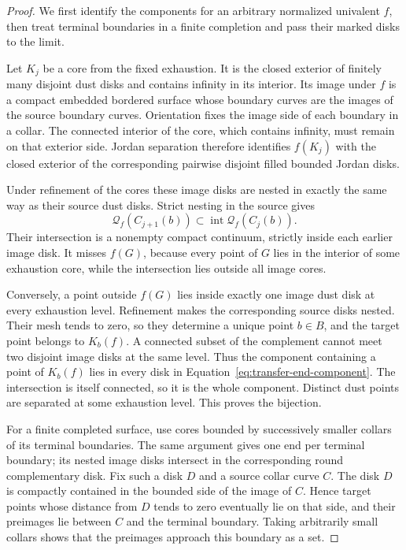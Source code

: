 \begin{proof}
We first identify the components for an arbitrary normalized univalent
$f$, then treat terminal boundaries in a finite completion and pass
their marked disks to the limit.

Let $K_j$ be a core from the fixed exhaustion.  It is the closed
exterior of finitely many disjoint dust disks and contains infinity
in its interior.  Its image under $f$ is a compact embedded bordered
surface whose boundary curves are the images of the source boundary
curves.  Orientation fixes the image side of each boundary in a
collar.  The connected interior of the core, which contains infinity,
must remain on that exterior side.  Jordan separation therefore
identifies $f(K_j)$ with the closed exterior of the corresponding
pairwise disjoint filled bounded Jordan disks.

Under refinement of the cores these image disks are nested in exactly
the same way as their source dust disks.  Strict nesting in the source
gives
\[
 \mathcal Q_f(C_{j+1}(b))
 \subset\operatorname{int}\mathcal Q_f(C_j(b)).
\]
Their intersection is a nonempty compact continuum, strictly inside
each earlier image disk.  It misses $f(G)$, because every point of
$G$ lies in the interior of some exhaustion core, while the
intersection lies outside all image cores.

Conversely, a point outside $f(G)$ lies inside exactly one image dust
disk at every exhaustion level.  Refinement makes the corresponding
source disks nested.  Their mesh tends to zero, so they determine a
unique point $b\in B$, and the target point belongs to $K_b(f)$.
A connected subset of the complement cannot meet two disjoint image
disks at the same level.  Thus the component containing a point of
$K_b(f)$ lies in every disk in
Equation~\eqref{eq:transfer-end-component}.  The intersection is
itself connected, so it is the whole component.  Distinct dust points
are separated at some exhaustion level.  This proves the bijection.

For a finite completed surface, use cores bounded by successively
smaller collars of its terminal boundaries.  The same argument gives
one end per terminal boundary; its nested image disks intersect in
the corresponding round complementary disk.  Fix such a disk $D$
and a source collar curve $C$.  The disk $D$ is compactly contained
in the bounded side of the image of $C$.  Hence target points whose
distance from $D$ tends to zero eventually lie on that side, and their
preimages lie between $C$ and the terminal boundary.  Taking
arbitrarily small collars shows that the preimages approach this
boundary as a set.


\end{proof}
